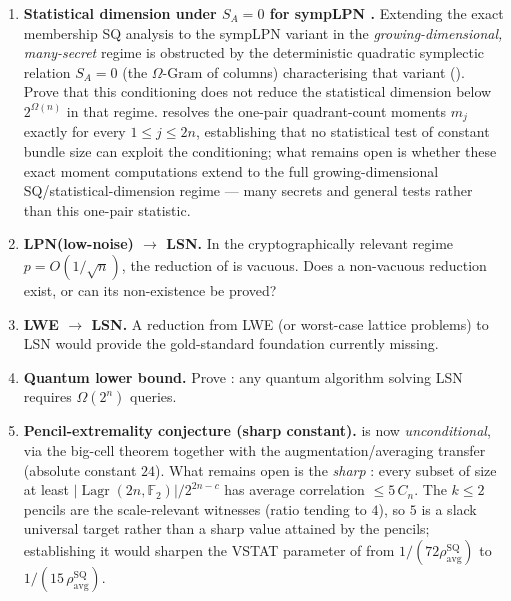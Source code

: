 \documentclass[11pt,a4paper]{article}
\theoremstyle{plain}
\theoremstyle{definition}
\newcommand{\F}{\mathbb{F}}
\DeclareMathOperator{\Lagr}{Lagr}
\begin{document}
\begin{enumerate}
\item \textbf{Statistical dimension under $S_A=0$ for sympLPN \cite{LPQR26}.}\label{open:statdim} Extending the exact membership SQ analysis to the sympLPN variant in the \emph{growing-dimensional, many-secret} regime is obstructed by the deterministic quadratic symplectic relation $S_A=0$ (the $\Omega$-Gram of columns) characterising that variant (). Prove that this conditioning does not reduce the statistical dimension below $2^{\Omega(n)}$ in that regime.  resolves the one-pair quadrant-count moments $m_j$ exactly for every $1 \le j \le 2n$, establishing that no statistical test of constant bundle size can exploit the conditioning; what remains open is whether these exact moment computations extend to the full growing-dimensional SQ/statistical-dimension regime --- many secrets and general tests rather than this one-pair statistic.

\item \textbf{LPN(low-noise) $\to$ LSN.} In the cryptographically relevant regime $p=O(1/\sqrt{n})$, the reduction of \cite{KLP+25} is vacuous. Does a non-vacuous reduction exist, or can its non-existence be proved?

\item \textbf{LWE $\to$ LSN.} A reduction from LWE (or worst-case lattice problems) to LSN would provide the gold-standard foundation currently missing.

\item \textbf{Quantum lower bound.} Prove : any quantum algorithm solving LSN requires $\Omega(2^n)$ queries.

\item \textbf{Pencil-extremality conjecture (sharp constant).} \label{open:pencil-sharp}  is now \emph{unconditional}, via the big-cell theorem together with the augmentation/averaging transfer (absolute constant $24$). What remains open is the \emph{sharp} : every subset of size at least $|\Lagr(2n,\F_2)|/2^{2n-c}$ has average correlation $\leq 5\,C_n$. The $k\le 2$ pencils are the scale-relevant witnesses (ratio tending to $4$), so $5$ is a slack universal target rather than a sharp value attained by the pencils; establishing it would sharpen the VSTAT parameter of  from $1/(72\rho_{\mathrm{avg}}^{\mathrm{SQ}})$ to $1/(15\,\rho_{\mathrm{avg}}^{\mathrm{SQ}})$.


\end{enumerate}
\end{document}
